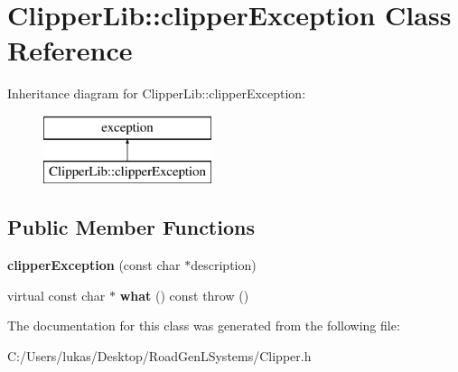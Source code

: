 \hypertarget{class_clipper_lib_1_1clipper_exception}{}\section{Clipper\+Lib\+:\+:clipper\+Exception Class Reference}
\label{class_clipper_lib_1_1clipper_exception}
Inheritance diagram for Clipper\+Lib\+:\+:clipper\+Exception\+:\begin{figure}[H]
\begin{center}
\leavevmode
\includegraphics[height=2.000000cm]{class_clipper_lib_1_1clipper_exception}
\end{center}
\end{figure}
\subsection*{Public Member Functions}
\begin{DoxyCompactItemize}
\item 
\hypertarget{class_clipper_lib_1_1clipper_exception_a7d44b32d06cd870500355667f6e0d6ed}{}\label{class_clipper_lib_1_1clipper_exception_a7d44b32d06cd870500355667f6e0d6ed} 
{\bfseries clipper\+Exception} (const char $\ast$description)
\item 
\hypertarget{class_clipper_lib_1_1clipper_exception_a32b7ac5a3176d9040ef0a863fd54657a}{}\label{class_clipper_lib_1_1clipper_exception_a32b7ac5a3176d9040ef0a863fd54657a} 
virtual const char $\ast$ {\bfseries what} () const  throw ()
\end{DoxyCompactItemize}


The documentation for this class was generated from the following file\+:\begin{DoxyCompactItemize}
\item 
C\+:/\+Users/lukas/\+Desktop/\+Road\+Gen\+L\+Systems/Clipper.\+h\end{DoxyCompactItemize}
